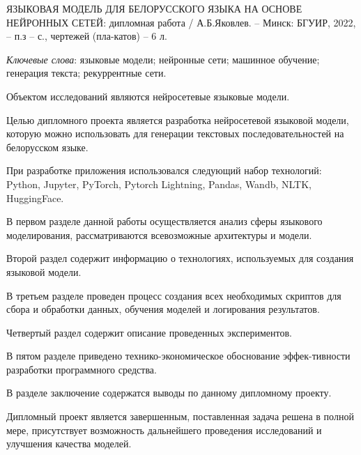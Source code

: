 \thispagestyle{empty}

ЯЗЫКОВАЯ МОДЕЛЬ ДЛЯ БЕЛОРУССКОГО ЯЗЫКА НА ОСНОВЕ НЕЙРОННЫХ СЕТЕЙ: дипломная работа / А.Б.Яковлев. –  Минск: БГУИР, 2022, – п.з – \pageref*{LastPage} с., чертежей (пла-катов) – 6 л.

\emph{Ключевые слова}: языковые модели; нейронные сети; машинное обучение; генерация текста; рекуррентные сети.


Объектом исследований являются нейросетевые языковые модели.

Целью дипломного проекта является разработка нейросетевой языковой модели, которую можно использовать для генерации текстовых последовательностей на белорусском языке.

При разработке приложения использовался следующий набор технологий: Python, Jupyter, PyTorch, Pytorch Lightning, Pandas, Wandb, NLTK, HuggingFace.

В первом разделе данной работы осуществляется анализ сферы языкового моделирования, рассматриваются всевозможные архитектуры и модели.

Второй раздел содержит информацию о технологиях, используемых для создания языковой модели.

В третьем разделе проведен процесс создания всех необходимых скриптов для сбора и обработки данных, обучения моделей и логирования результатов.

Четвертый раздел содержит описание проведенных экспериментов.

В пятом разделе приведено технико-экономическое обоснование эффек-тивности разработки программного средства.

В разделе заключение содержатся выводы по данному дипломному проекту.

Дипломный проект является завершенным, поставленная задача решена в полной мере, присутствует возможность дальнейшего проведения исследований и улучшения качества моделей.

\clearpage
